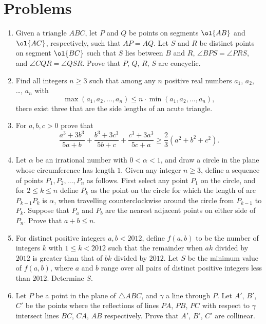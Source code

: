 \documentclass[11pt]{scrartcl}
\begin{document}
\section{Problems}
\begin{enumerate}[\bfseries 1.]
\item %
Given a triangle $ABC$, let $P$ and $Q$ be points
on segments $\ol{AB}$ and $\ol{AC}$, respectively, such that $AP=AQ$.
Let $S$ and $R$ be distinct points on segment $\ol{BC}$
such that $S$ lies between $B$ and $R$,
$\angle BPS=\angle PRS$, and $\angle CQR=\angle QSR$.
Prove that $P$, $Q$, $R$, $S$ are concyclic.

\item %
Find all integers $n \ge 3$ such that
among any $n$ positive real numbers
$a_1$, $a_2$, \dots, $a_n$ with
\[ \max(a_1,a_2,\dots,a_n)
  \le n \cdot \min(a_1,a_2,\dots,a_n), \]
there exist three that are the side lengths
of an acute triangle.

\item %
For $a,b,c > 0$ prove that
\[ \frac{a^3+3b^3}{5a+b}
  + \frac{b^3+3c^3}{5b+c}
  + \frac{c^3+3a^3}{5c+a}
  \ge \frac23(a^2+b^2+c^2).  \]

\item %
Let $\alpha$ be an irrational number with $0 < \alpha < 1$,
and draw a circle in the plane whose
circumference has length $1$.
Given any integer $n\ge 3$,
define a sequence of points $P_1, P_2, \dots, P_n$ as follows.
First select any point $P_1$ on the circle,
and for $2\le k\le n$ define $P_k$
as the point on the circle for which the length
of arc $P_{k-1}P_k$ is $\alpha$,
when travelling counterclockwise around the circle
from $P_{k-1}$ to $P_k$. Suppose that $P_a$ and $P_b$
are the nearest adjacent points on either side of $P_n$.
Prove that $a+b\le n$.

\item %
For distinct positive integers $a, b<2012$,
define $f(a, b)$ to be the number of integers $k$ with $1\le k<2012$
such that the remainder when $ak$ divided by $2012$ is
greater than that of $bk$ divided by $2012$.
Let $S$ be the minimum value of $f(a, b)$, where $a$ and $b$ range
over all pairs of distinct positive integers less than $2012$.
Determine $S$.

\item %
Let $P$ be a point in the plane of $\triangle ABC$,
and $\gamma$ a line through $P$.
Let $A'$, $B'$, $C'$ be the points where the
reflections of lines $PA$, $PB$, $PC$ with respect to $\gamma$
intersect lines $BC$, $CA$, $AB$ respectively.
Prove that $A'$, $B'$, $C'$ are collinear.

\end{enumerate}
\pagebreak
\end{document}
